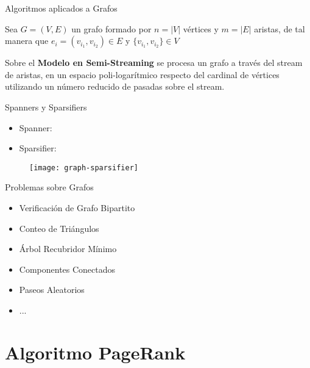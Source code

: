 \documentclass[12pt]{beamer}
\begin{document}
    \begin{frame}[fragile]{Algoritmos aplicados a Grafos}

      Sea $G=(V,E)$ un grafo formado por $n=|V|$ vértices y $m=|E|$ aristas, de tal manera que $e_i = (v_{i_1},v_{i_2}) \in E$ y $\{v_{i_1},v_{i_2}\} \in V$

      Sobre el \textbf{Modelo en Semi-Streaming} se procesa un grafo a través del stream de aristas, en un espacio poli-logarítmico respecto del cardinal de vértices utilizando un número reducido de pasadas sobre el stream.

    \end{frame}

    \begin{frame}[fragile]{Spanners y Sparsifiers}

      \begin{itemize}
        \item Spanner:
        \item Sparsifier:
      \end{itemize}

      \begin{figure}
        \texttt{[image: graph-sparsifier]}
        \caption{}
        \label{}
      \end{figure}

    \end{frame}

    \begin{frame}[fragile]{Problemas sobre Grafos}

      \begin{itemize}
        \item Verificación de Grafo Bipartito \cite{feigenbaum2005graph}
        \item Conteo de Triángulos \cite{bar2002reductions}
        \item Árbol Recubridor Mínimo \cite{ahn2012analyzing}
        \item Componentes Conectados \cite{ahn2012analyzing}
        \item Paseos Aleatorios \cite{sarma2011estimating}
        \item ...
      \end{itemize}

    \end{frame}

  \section{Algoritmo PageRank}
\end{document}
